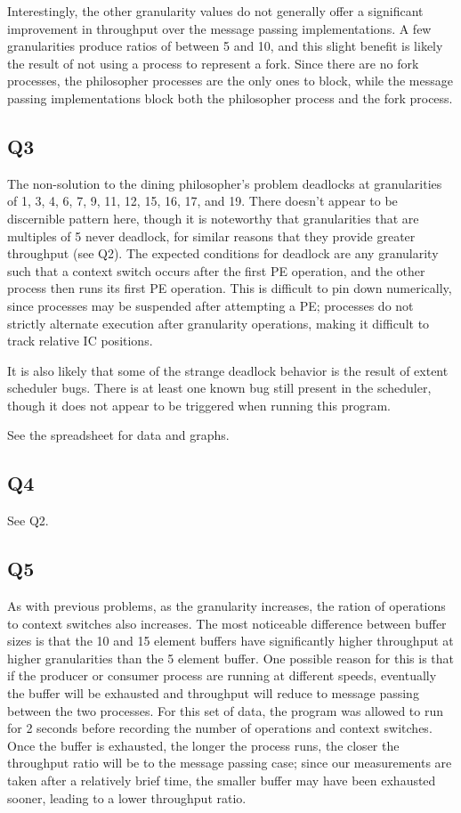 \documentclass[12pt]{article}
\begin{document}
Interestingly, the other
granularity values do not generally offer a significant improvement in throughput over
the message passing implementations. A few granularities produce ratios of between 5 and 10,
and this slight benefit is likely the result of not using a process  to represent a fork. Since
there are no fork processes, the philosopher processes are the only ones to block, while
the message passing implementations block both the philosopher process and the fork
process.
\subsection{Q3}
The non-solution to the dining philosopher's problem deadlocks at granularities of
1, 3, 4, 6, 7, 9, 11, 12, 15, 16, 17, and 19. There doesn't appear to be discernible
pattern here, though it is noteworthy that granularities that are multiples of 5 never
deadlock, for similar reasons that they provide greater throughput (see Q2).  The expected
conditions for deadlock are any granularity such that a context switch occurs after the first
PE operation, and the other process then runs its first PE operation. This is difficult to pin down
numerically, since processes may be suspended after attempting a PE; processes do not
strictly alternate execution after granularity operations, making it difficult to track relative
IC positions.

It is also likely that some of the strange deadlock behavior is the result of extent
scheduler bugs. There is at least one known bug still present in the scheduler, though it
does not appear to be triggered when running this program.

See the spreadsheet for data and graphs.
\subsection{Q4}
See Q2.
\subsection{Q5}
As with previous problems, as the granularity increases, the ration of operations to context
switches also increases. The most noticeable difference between buffer sizes is that the
10 and 15 element buffers have significantly higher throughput at higher granularities than
the 5 element buffer. One possible reason for this is that if the producer or consumer process
are running at different speeds, eventually the buffer will be exhausted and throughput will
reduce to message passing between the two processes. For this set of data, the program was
allowed to run for 2 seconds before recording the number of operations and context switches.
Once the buffer is exhausted, the longer the process runs, the closer the throughput ratio will
be to the message passing case; since our measurements are taken after a relatively brief time,
the smaller buffer may have been exhausted sooner, leading to a lower throughput ratio.
\end{document}
